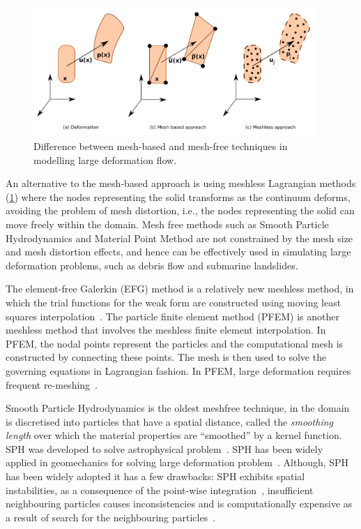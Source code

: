 \begin{figure}[tbhp]
\centering
\includegraphics[width=0.95\textwidth]{NumericalMethods}
\caption{Difference between mesh-based and mesh-free techniques in modelling 
large deformation flow.}
\label{fig:NumericalMethods}
\end{figure}

An alternative to the mesh-based approach is using meshless Lagrangian methods 
(\cref{fig:NumericalMethods}) where the nodes representing the solid transforms 
as the continuum deforms, avoiding the problem of mesh distortion, i.e., the 
nodes representing the solid can move freely within the domain. Mesh free 
methods such as Smooth Particle Hydrodynamics and Material Point Method are not 
constrained by the mesh size and mesh distortion effects, and hence can be 
effectively used in simulating large deformation problems, such as debris flow 
and submarine landslides.

The element-free Galerkin (EFG) method is a relatively new meshless 
method, in which the trial functions for the weak form are constructed using 
moving least squares interpolation~\citep{Belytschko1994}. The particle finite 
element method (PFEM) is another meshless method that involves the meshless 
finite element interpolation. In PFEM, the nodal points represent the 
particles and the computational mesh is constructed by connecting these points. 
The mesh is then used to solve the governing equations in Lagrangian fashion. 
In PFEM, large deformation requires frequent re-meshing~\citep{Kafaji2013}.

Smooth Particle Hydrodynamics is the oldest meshfree technique, in the domain 
is discretised into particles that have a spatial distance, called the 
\textit{smoothing length} over which the material properties are ``smoothed'' 
by a kernel function. SPH was developed to solve astrophysical 
problem~\citep{Monaghan2005}. SPH has been widely applied 
in geomechanics for solving large deformation 
problem~\citep{Augarde2009,Maeda2010,Mori2008}. Although, SPH has been widely 
adopted it has a few drawbacks: SPH exhibits 
spatial instabilities, as a consequence of the point-wise 
integration~\citep{Bonet2000}, insufficient neighbouring particles causes 
inconsistencies and is computationally expensive as a result of search for the 
neighbouring particles~\citep{Bandara2013}.

